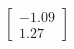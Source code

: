 \documentclass[preview]{standalone}
\begin{document}
\begin{align*}
\begin{bmatrix} -1.09 \\ 1.27 \end{bmatrix}
\end{align*}
\end{document}
